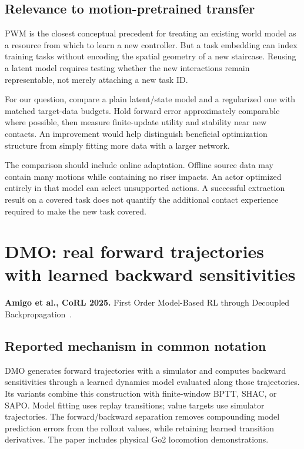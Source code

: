 \subsection{Relevance to motion-pretrained transfer}
PWM is the closest conceptual precedent for treating an existing world model as
a resource from which to learn a new controller. But a task embedding can index
training tasks without encoding the spatial geometry of a new staircase. Reusing
a latent model requires testing whether the new interactions remain representable,
not merely attaching a new task ID.

For our question, compare a plain latent/state model and a regularized one with
matched target-data budgets. Hold forward error approximately comparable where
possible, then measure finite-update utility and stability near new contacts.
An improvement would help distinguish beneficial optimization structure from
simply fitting more data with a larger network.

The comparison should include online adaptation. Offline source data may contain
many motions while containing no riser impacts. An actor optimized entirely in
that model can select unsupported actions. A successful extraction result on a
covered task does not quantify the additional contact experience required to
make the new task covered.

\section{DMO: real forward trajectories with learned backward sensitivities}\label{sec:dmo}
\textbf{Amigo et al., CoRL 2025.} First Order Model-Based RL through Decoupled
Backpropagation~\cite{dmo}.

\subsection{Reported mechanism in common notation}
DMO generates forward trajectories with a simulator and computes backward
sensitivities through a learned dynamics model evaluated along those trajectories.
Its variants combine this construction with finite-window BPTT, SHAC, or SAPO.
Model fitting uses replay transitions; value targets use simulator trajectories.
The forward/backward separation removes compounding model prediction errors
from the rollout values, while retaining learned transition derivatives.
The paper includes physical Go2 locomotion demonstrations.

